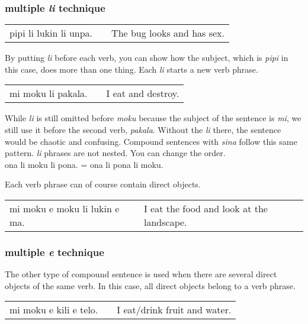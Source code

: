 \subsubsection*{multiple \textit{li} technique}
%

\begin{supertabular}{p{5,5cm}|ll}
pipi li lukin li unpa. && The bug looks and has sex. \\
\end{supertabular} 

By putting \textit{li} before each verb, you can show how the subject, which is \textit{pipi} in this case, does more than one thing. 
Each \textit{li} starts a new verb phrase. 

\begin{supertabular}{p{5,5cm}|ll}
mi moku li pakala. && I eat and destroy. \\
\end{supertabular} 

While \textit{li} is still omitted before \textit{moku} because the subject of the sentence is \textit{mi}, we still use it before the second verb, \textit{pakala}. 
Without the \textit{li} there, the sentence would be chaotic and confusing. 
Compound sentences with \textit{sina} follow this same pattern. 
\textit{li} phrases are not nested. You can change the order. \\
ona li moku li pona. = ona li pona li moku. 

Each verb phrase can of course contain direct objects. 

\begin{supertabular}{p{5,5cm}|ll}
mi moku e moku li lukin e ma. && I eat the food and look at the landscape. \\
\end{supertabular} 
%
\label{'multiple_e'}
\subsubsection*{multiple \textit{e} technique}
%
The other type of compound sentence is used when there are several direct objects of the same verb.
In this case, all direct objects belong to a verb phrase. 

\begin{supertabular}{p{5,5cm}|ll}
mi moku e kili e telo. && I eat/drink fruit and water. \\
\end{supertabular} 

